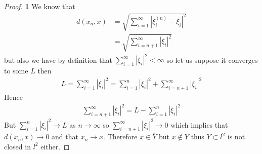 \documentclass[11pt]{article}
\theoremstyle{definition}
\begin{document}
\begin{proof}{\textbf{1}}
    We know that
    \begin{align*}
        d(x_n, x) &= \sqrt{\sum_{i=1}^\infty |\xi_i^{(n)} - \xi_i|^2}\\
        &= \sqrt{\sum_{i=n+1}^\infty |\xi_i|^2}
    \end{align*}
    but also we have by definition that $\sum_{i=1}^\infty |\xi_i|^2 < \infty$
    so let us suppose it converges to some $L$ then
    \begin{align*}
        L = \sum_{i=1}^\infty |\xi_i|^2 = \sum_{i=1}^n |\xi_i|^2
        + \sum_{i=n+ 1}^\infty |\xi_i|^2
    \end{align*}
    Hence
    \begin{align*}
        \sum_{i=n+ 1}^\infty |\xi_i|^2 =  L - \sum_{i=1}^n |\xi_i|^2
    \end{align*}
    But $\sum_{i=1}^n |\xi_i|^2 \to L$ as $n \to \infty$ so
    $\sum_{i=n+ 1}^\infty |\xi_i|^2 \to 0$ which implies that $d(x_n, x) \to 0$
    and that $x_n \to x$. Therefore $x \in \overline{Y}$ but $x \not\in Y$
    thus $Y \subset l^2$ is not closed in $l^2$ either.
\end{proof}
\end{document}
